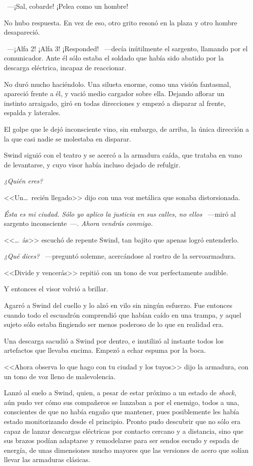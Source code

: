 ~---¡Sal, cobarde! ¡Pelea como un hombre!

No hubo respuesta. En vez de eso, otro grito resonó en la plaza y otro hombre desapareció.

~---¡Alfa 2! ¡Alfa 3! ¡Responded! ~---decía inútilmente el sargento, llamando por el comunicador. Ante él sólo estaba el soldado que había sido abatido por la descarga eléctrica, incapaz de reaccionar.

No duró mucho haciéndolo. Una silueta enorme, como una visión fantasmal, apareció frente a él, y vació medio cargador sobre ella. Dejando aflorar un instinto arraigado, giró en todas direcciones y empezó a disparar al frente, espalda y laterales.

El golpe que le dejó inconsciente vino, sin embargo, de arriba, la única dirección a la que casi nadie se molestaba en disparar.

Swind siguió con el teatro y se acercó a la armadura caída, que trataba en vano de levantarse, y cuyo visor había incluso dejado de refulgir.

\emph{¿Quién eres?}

<<Un\dots\ recién llegado>> dijo con una voz metálica que sonaba distorsionada.

\emph{Ésta es mi ciudad. Sólo yo aplico la justicia en sus calles, no ellos} ~---miró al sargento inconsciente~---. \emph{Ahora vendrás conmigo.}

<<\dots\ ás>> escuchó de repente Swind, tan bajito que apenas logró entenderlo.

\emph{¿Qué dices?} ~---preguntó solemne, acercándose al rostro de la servoarmadura.

<<Divide y vencerás>> repitió con un tono de voz perfectamente audible.

Y entonces el visor volvió a brillar.

Agarró a Swind del cuello y lo alzó en vilo sin ningún esfuerzo. Fue entonces cuando todo el escuadrón comprendió que habían caído en una trampa, y aquel sujeto sólo estaba fingiendo ser menos poderoso de lo que en realidad era.

Una descarga sacudió a Swind por dentro, e inutilizó al instante todos los artefactos que llevaba encima. Empezó a echar espuma por la boca.

<<Ahora observa lo que hago con tu ciudad y los tuyos>> dijo la armadura, con un tono de voz lleno de malevolencia.

Lanzó al suelo a Swind, quien, a pesar de estar próximo a un estado de \emph{shock}, aún pudo ver cómo sus compañeros se lanzaban a por el enemigo, todos a una, conscientes de que no había engaño que mantener, pues posiblemente les había estado monitorizando desde el principio. Pronto pudo descubrir que no sólo era capaz de lanzar descargas eléctricas por contacto cercano y a distancia, sino que sus brazos podían adaptarse y remodelarse para ser sendos escudo y espada de energía, de unas dimensiones mucho mayores que las versiones de acero que solían llevar las armaduras clásicas.

